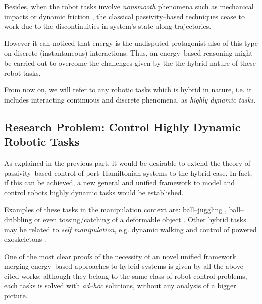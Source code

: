 %
Besides, when the robot tasks involve \textit{nonsmooth} phenomena such as mechanical impacts or dynamic friction \cite{brogliato1999nonsmooth}, the classical passivity--based techniques cease to work due to the discontinuities in system's state along trajectories. 

However it can noticed that energy is the undisputed protagonist also of this type on discrete (instantaneous) interactions. Thus, an energy--based reasoning might be carried out to overcome the challenges given by the the hybrid nature of these robot tasks.  

From now on, we will refer to any robotic tasks which is hybrid in nature, i.e. it includes interacting continuous and discrete phenomena, as \textit{highly dynamic tasks}.
\subsection{Research Problem: Control Highly Dynamic Robotic Tasks}
%
As explained in the previous part, it would be desirable to extend the theory of passivity--based control of port--Hamiltonian systems to the hybrid case. In fact, if this can be achieved, a new general and unified framework to model and control robots highly dynamic tasks would be established.
%
\newline

%
Examples of these tasks in the manipulation context are:
ball--juggling \cite{sanfelice2007hybrid, tian2013}, ball--dribbling \cite{Batz2010, haddadin2018exploiting} or even tossing/catching of a deformable object \cite{ruggero2018}. 
Other hybrid tasks may be related to \textit{self manipulation}, e.g. dynamic walking \cite{spong2007,westervelt2018feedback} and control of powered exoskeletons \cite{harib2018feedback,lv2018design}.
%
\newline

%
One of the most clear proofs of the necessity of an novel unified framework merging energy--based approaches to hybrid systems is given by all the above cited works: although they belong to the same class of robot control problems, each tasks is solved with \textit{ad--hoc} solutions, without any analysis of a bigger picture.  
%
\newline

